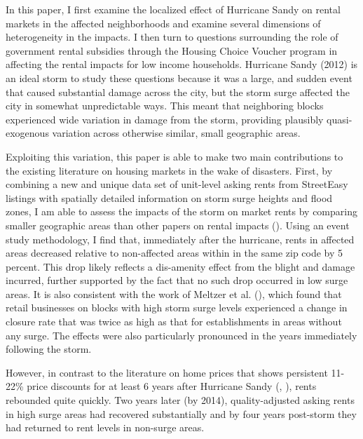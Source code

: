 \documentclass[12pt]{article}
\begin{document}
In this paper, I first examine the localized effect of Hurricane Sandy on rental markets in the affected neighborhoods and examine several dimensions of heterogeneity in the impacts. I then turn to questions surrounding the role of government rental subsidies through the Housing Choice Voucher program in affecting the rental impacts for low income households. Hurricane Sandy (2012) is an ideal storm to study these questions because it was a large, and sudden event that caused substantial damage across the city, but the storm surge affected the city in somewhat unpredictable ways. This meant that neighboring blocks experienced wide variation in damage from the storm, providing plausibly quasi-exogenous variation across otherwise similar, small geographic areas. 

Exploiting this variation, this paper is able to make two main contributions to the existing literature on housing markets in the wake of disasters. First, by combining a new and unique data set of unit-level asking rents from StreetEasy listings with spatially detailed information on storm surge heights and flood zones, I am able to assess the impacts of the storm on market rents by comparing smaller geographic areas than other papers on rental impacts (\cite{an_rental_2020}).  Using an event study methodology, I find that, immediately after the hurricane, rents in affected areas decreased relative to non-affected areas within in the same zip code by 5 percent.   This drop likely reflects a dis-amenity effect from the blight and damage incurred, further supported by the fact that no such drop occurred in low surge areas. It is also consistent with the work of Meltzer et al. (\citeyear{meltzer_localized_2021}), which found that retail businesses on blocks with high storm surge levels experienced a change in closure rate that was twice as high as that for establishments in areas without any surge. The effects were also particularly pronounced in the years immediately following the storm.    

However, in contrast to the literature on home prices that shows persistent 11-22\% price discounts for at least 6 years after Hurricane Sandy (\cite{ellen_heterogeneity_2022}, \cite{ortega_rising_2018}), rents rebounded quite quickly.  Two years later (by 2014), quality-adjusted asking rents in high surge areas had recovered substantially and by four years post-storm they had returned to rent levels in non-surge areas. 
\end{document}
